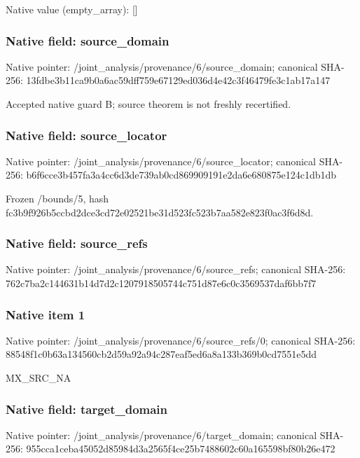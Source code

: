 \documentclass[10pt,a4paper]{article}
\begin{document}
Native value (empty\_\allowbreak{}array): []

\subsubsection{Native field: source\_\allowbreak{}domain}
Native pointer: /joint\_\allowbreak{}analysis/provenance/6/source\_\allowbreak{}domain; canonical SHA-256: 13fdbe3b11ca9b0a6ac59dff759e67129ed036d4e42c3f46479fe3c1ab17a147

\begingroup\raggedright\sloppy Accepted native guard B;\allowbreak{} source theorem is not freshly recertified.\par\endgroup

\subsubsection{Native field: source\_\allowbreak{}locator}
Native pointer: /joint\_\allowbreak{}analysis/provenance/6/source\_\allowbreak{}locator; canonical SHA-256: b6f6cce3b457fa3a4cc6d3de739ab0cd869909191e2da6e680875e124c1db1db

\begingroup\raggedright\sloppy Frozen /\allowbreak{}bounds/\allowbreak{}5,\allowbreak{} hash fc3b9f926b5ccbd2dce3cd72e02521be31d523fc523b7aa582e823f0ac3f6d8d.\par\endgroup

\subsubsection{Native field: source\_\allowbreak{}refs}
Native pointer: /joint\_\allowbreak{}analysis/provenance/6/source\_\allowbreak{}refs; canonical SHA-256: 762c7ba2c144631b14d7d2c1207918505744c751d87e6c0c3569537daf6bb7f7

\subsubsection{Native item 1}
Native pointer: /joint\_\allowbreak{}analysis/provenance/6/source\_\allowbreak{}refs/0; canonical SHA-256: 88548f1c0b63a134560cb2d59a92a94c287eaf5ed6a8a133b369b0cd7551e5dd

\begingroup\raggedright\sloppy MX\_\allowbreak{}SRC\_\allowbreak{}NA\par\endgroup

\subsubsection{Native field: target\_\allowbreak{}domain}
Native pointer: /joint\_\allowbreak{}analysis/provenance/6/target\_\allowbreak{}domain; canonical SHA-256: 955cca1ceba45052d85984d3a2565f4ce25b7488602c60a165598bf80b26e472
\end{document}
